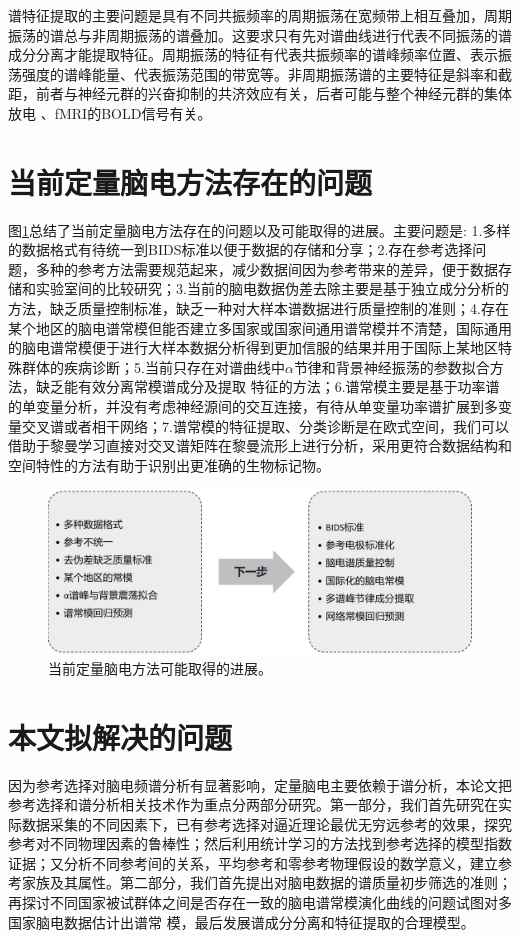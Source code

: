 谱特征提取的主要问题是具有不同共振频率的周期振荡在宽频带上相互叠加，周期振荡的谱总与非周期振荡的谱叠加。这要求只有先对谱曲线进行代表不同振荡的谱成分分离才能提取特征。周期振荡的特征有代表共振频率的谱峰频率位置、表示振荡强度的谱峰能量、代表振荡范围的带宽等。非周期振荡谱的主要特征是斜率和截距，前者与神经元群的兴奋抑制的共济效应有关，后者可能与整个神经元群的集体放电
、fMRI的BOLD信号有关。

\section{当前定量脑电方法存在的问题}
图\ref{1:qEEGnext}总结了当前定量脑电方法存在的问题以及可能取得的进展。主要问题是: 1.多样的数据格式有待统一到BIDS标准以便于数据的存储和分享；2.存在参考选择问题，多种的参考方法需要规范起来，减少数据间因为参考带来的差异，便于数据存储和实验室间的比较研究；3.当前的脑电数据伪差去除主要是基于独立成分分析的方法，缺乏质量控制标准，缺乏一种对大样本谱数据进行质量控制的准则；4.存在某个地区的脑电谱常模但能否建立多国家或国家间通用谱常模并不清楚，国际通用的脑电谱常模便于进行大样本数据分析得到更加信服的结果并用于国际上某地区特殊群体的疾病诊断；5.当前只存在对谱曲线中$\alpha$节律和背景神经振荡的参数拟合方法，缺乏能有效分离常模谱成分及提取
特征的方法；6.谱常模主要是基于功率谱的单变量分析，并没有考虑神经源间的交互连接，有待从单变量功率谱扩展到多变量交叉谱或者相干网络；7.谱常模的特征提取、分类诊断是在欧式空间，我们可以借助于黎曼学习直接对交叉谱矩阵在黎曼流形上进行分析，采用更符合数据结构和空间特性的方法有助于识别出更准确的生物标记物。
\begin{figure}[!h]
	\includegraphics[width=12cm]{pic/xulun/qEEGnext.png}
	\caption{当前定量脑电方法可能取得的进展。}
	\label{1:qEEGnext}
\end{figure}

\section{本文拟解决的问题}
因为参考选择对脑电频谱分析有显著影响，定量脑电主要依赖于谱分析，本论文把参考选择和谱分析相关技术作为重点分两部分研究。第一部分，我们首先研究在实际数据采集的不同因素下，已有参考选择对逼近理论最优无穷远参考的效果，探究参考对不同物理因素的鲁棒性；然后利用统计学习的方法找到参考选择的模型指数证据；又分析不同参考间的关系，平均参考和零参考物理假设的数学意义，建立参考家族及其属性。第二部分，我们首先提出对脑电数据的谱质量初步筛选的准则；再探讨不同国家被试群体之间是否存在一致的脑电谱常模演化曲线的问题试图对多国家脑电数据估计出谱常
模，最后发展谱成分分离和特征提取的合理模型。


